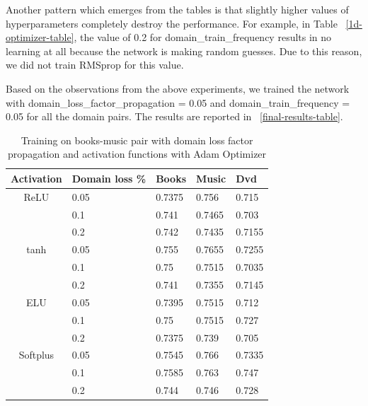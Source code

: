 \documentclass[11pt,a4paper]{article}
\begin{document}
Another pattern which emerges from the tables is that slightly higher values of hyperparameters completely destroy the performance. For example, in Table ~\ref{1d-optimizer-table}, the value of 0.2 for domain\_train\_frequency results in no learning at all because the network is making random guesses. Due to this reason, we did not train RMSprop for this value.

Based on the observations from the above experiments, we trained the network with domain\_loss\_factor\_propagation = 0.05 and domain\_train\_frequency = 0.05 for all the domain pairs. The results are reported in ~\ref{final-results-table}.

\begin{table}[h]
\begin{center}
\begin{tabular}{|c|l|l|l|l|}
\hline
Activation & \multicolumn{1}{|p{1cm}|}{Domain loss \%}& Books & Music & Dvd \\
\hline
ReLU & 0.05 & 0.7375 & 0.756 & 0.715  \\
 & 0.1 & 0.741 & 0.7465 & 0.703 \\
 & 0.2 & 0.742 & 0.7435 & 0.7155 \\
\hline
tanh & 0.05 & 0.755 & 0.7655 & 0.7255 \\
 & 0.1 & 0.75 & 0.7515 & 0.7035 \\
 & 0.2 & 0.741 & 0.7355 & 0.7145 \\
\hline
ELU & 0.05 & 0.7395 & 0.7515 & 0.712 \\
 & 0.1 & 0.75 & 0.7515 & 0.727 \\
 & 0.2 & 0.7375 & 0.739 & 0.705 \\
\hline
Softplus & 0.05 & 0.7545 & 0.766 & 0.7335 \\
 & 0.1 & 0.7585 & 0.763 & 0.747 \\
 & 0.2 & 0.744 & 0.746 & 0.728 \\
\hline
\end{tabular}
\end{center}
\caption{ Training on books-music pair with domain loss factor propagation and activation functions with Adam Optimizer}
\label{alpha-activation-table}
\end{table}
\end{document}
